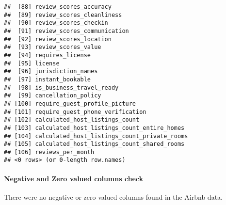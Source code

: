 \documentclass[
]{article}
\begin{document}
\begin{verbatim}
##  [88] review_scores_accuracy                      
##  [89] review_scores_cleanliness                   
##  [90] review_scores_checkin                       
##  [91] review_scores_communication                 
##  [92] review_scores_location                      
##  [93] review_scores_value                         
##  [94] requires_license                            
##  [95] license                                     
##  [96] jurisdiction_names                          
##  [97] instant_bookable                            
##  [98] is_business_travel_ready                    
##  [99] cancellation_policy                         
## [100] require_guest_profile_picture               
## [101] require_guest_phone_verification            
## [102] calculated_host_listings_count              
## [103] calculated_host_listings_count_entire_homes 
## [104] calculated_host_listings_count_private_rooms
## [105] calculated_host_listings_count_shared_rooms 
## [106] reviews_per_month                           
## <0 rows> (or 0-length row.names)
\end{verbatim}

\hypertarget{negative-and-zero-valued-columns-check-1}{%
\paragraph{Negative and Zero valued columns
check}\label{negative-and-zero-valued-columns-check-1}}

There were no negative or zero valued columns found in the Airbnb data.
\end{document}
